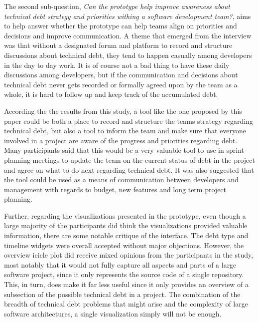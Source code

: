 The second sub-question, \textit{Can the prototype help improve awareness about technical debt strategy and priorities withing a software development team?}, aims to help answer whether the prototype can help teams align on priorities and decisions and improve communication.
A theme that emerged from the interview was that without a designated forum and platform to record and structure discussions about technical debt, they tend to happen casually among developers in the day to day work.
It is of course not a bad thing to have these daily discussions among developers, but if the communication and decisions about technical debt never gets recorded or formally agreed upon by the team as a whole, it is hard to follow up and keep track of the accumulated debt.

According the the results from this study, a tool like the one proposed by this paper could be both a place to record and structure the teams strategy regarding technical debt, but also a tool to inform the team and make sure that everyone involved in a project are aware of the progress and priorities regarding debt.
Many participants said that this would be a very valuable tool to use in sprint planning meetings to update the team on the current status of debt in the project and agree on what to do next regarding technical debt.
It was also suggested that the tool could be used as a means of communication between developers and management with regards to budget, new features and long term project planning.

Further, regarding the visualizations presented in the prototype, even though a large majority of the participants did think the visualizations provided valuable information, there are some notable critique of the interface.
The debt type and timeline widgets were overall accepted without major objections.
However, the overview icicle plot did receive mixed opinions from the participants in the study, most notably that it would not fully capture all aspects and parts of a large software project, since it only represents the source code of a single repository.
This, in turn, does make it far less useful since it only provides an overview of a subsection of the possible technical debt in a project.
The combination of the breadth of technical debt problems that might arise and the complexity of large software architectures, a single visualization simply will not be enough.

